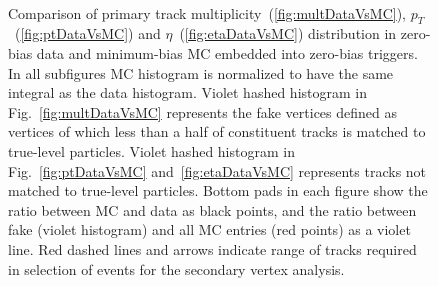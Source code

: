 \begin{figure}[b!]
{}%
\quad\quad%
\parbox{0.4725\textwidth}{
  \centering
  \begin{subfigure}[b]{\linewidth}\addtocounter{subfigure}{-2}
  \end{subfigure}\\
  \begin{minipage}[t][1.042\linewidth][t]{\linewidth}\vspace{10pt}
    \caption[Comparison of primary track multiplicity, $p_{T}$ and $\eta$ distribution in zero-bias data and embedded MC (minimum-bias).]%
    {Comparison of primary track multiplicity~(\ref{fig:multDataVsMC}), $p_{T}$~(\ref{fig:ptDataVsMC}) and $\eta$~(\ref{fig:etaDataVsMC}) distribution in zero-bias data and minimum-bias MC embedded into zero-bias triggers. In all subfigures MC histogram is normalized to have the same integral as the data histogram. Violet hashed histogram in Fig.~\ref{fig:multDataVsMC} represents the fake vertices defined as vertices of which less than a half of constituent tracks is matched to true-level particles. Violet hashed histogram in Fig.~\ref{fig:ptDataVsMC} and~\ref{fig:etaDataVsMC} represents tracks not matched to true-level particles. Bottom pads in each figure show the ratio between MC and data as black points, and the ratio between fake (violet histogram) and all MC entries (red points) as a violet line. Red dashed lines and arrows indicate range of tracks required in selection of events for the secondary vertex analysis.}\label{fig:deadMatMultiDataVsMC}
  \end{minipage}
}\vspace{-20pt}%
\end{figure}

